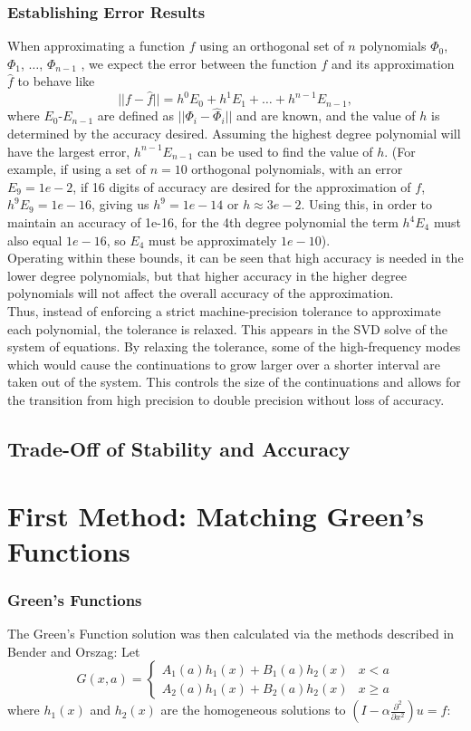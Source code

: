 \documentclass[11pt]{amsart}
\begin{document}
\subsubsection{Establishing Error Results}
When approximating a function $f$ using an orthogonal set of $n$ polynomials $\Phi_0$, $\Phi_1$, $\ldots$, $\Phi_{n-1}$ , we expect the error between the function $f$ and its approximation $\hat{f}$ to behave like
\begin{equation}
||f-\hat{f}|| = h^0 E_0 + h^1 E_1 + \ldots + h^{n-1} E_{n-1},
\end{equation} 
where $E_0$-$E_{n-1}$ are defined as $||\Phi_i-\hat{\Phi}_i||$ and are known, and the value of $h$ is determined by the accuracy desired. 
Assuming the highest degree polynomial will have the largest error, $h^{n-1}E_{n-1}$ can be used to find the value of $h$. 
(For example, if using a set of $n=10$ orthogonal polynomials, with an error $E_9=1e-2$, if 16 digits of accuracy are desired for the approximation of $f$, $h^9 E_9  = 1e-16$, giving us $h^9=1e-14$ or $h\approx 3e-2$.  Using this, in order to maintain an accuracy of 1e-16, for the 4th degree polynomial the term $h^4E_4$ must also equal $1e-16$, so $E_4$ must be approximately $1e-10$).  \\Operating within these bounds, it can be seen that high accuracy is needed in the lower degree polynomials, but that higher accuracy in the higher degree polynomials will not affect the overall accuracy of the approximation.  \\
Thus, instead of enforcing a strict machine-precision tolerance to approximate each polynomial, the tolerance is relaxed.  This appears in the SVD solve of the system of equations.  By relaxing the tolerance, some of the high-frequency modes which would cause the continuations to grow larger over a shorter interval are taken out of the system.  This controls the size of the continuations and allows for the transition from high precision to double precision without loss of accuracy. 
\subsection{Trade-Off of Stability and Accuracy}
\section{First Method: Matching Green's Functions}
\subsubsection{Green's Functions}
The Green's Function solution was then calculated via the methods described in Bender and Orszag: Let 
\begin{equation}
G(x,a)=\begin{cases}
A_1(a)h_1(x)+B_1(a)h_2(x) & x<a \\
A_2(a)h_1(x)+B_2(a)h_2(x) & x \geq a
\end{cases}
\end{equation}
where $h_1(x)$ and $h_2(x)$ are the homogeneous solutions to  $(I-\alpha \frac{\partial^2}{\partial x^2})u=f$:
\end{document}
